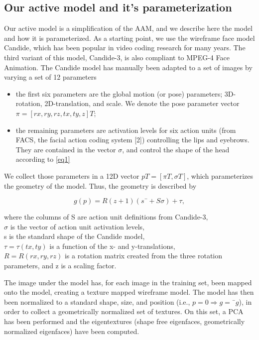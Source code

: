 \documentclass[12pt]{acmart}
\begin{document}
\begin{spacing}{2}   

\section{Our active model and it’s parameterization}
\label{sect:intro}  %
Our active model is a simplification of the AAM, and we describe here the model and how it is parameterized. As a starting point, we use the wireframe face model Candide, which has been popular in video coding research for many years. The third variant of this model, Candide-3, is also compliant to MPEG-4 Face Animation. The Candide model has manually been adapted to a set of images by varying a set of 12 parameters
\begin{itemize}
    \item the first six parameters are the global motion (or pose) parameters; 3D-rotation, 2D-translation, and scale. We denote the pose parameter vector $\pi = [rx ,ry ,rz ,tx ,ty ,z]T$;
    \item the remaining parameters are activation levels for six action units (from FACS, the facial action coding system [2]) controlling the lips and eyebrows. They are contained in the vector $\sigma$, and control the shape of the head according to \eqref{eq1}
\end{itemize}

We collect those parameters in a 12D vector $pT = [\pi T, \sigma T]$, which parameterizes the geometry of the model. Thus, the geometry is described by

\begin{equation}
    g(p)= R(z + 1)(s¯+ S\sigma)+ \tau,
    \label{eq1}
\end{equation}

where the columns of S are action unit definitions from Candide-3, \\
$\sigma$ is the vector of action unit activation levels, \\
s is the standard shape of the Candide model, \\
$\tau = \tau(tx,ty)$ is a function of the x- and y-translations, \\
$R = R(rx ,ry ,rz)$ is a rotation matrix created from the three rotation parameters, and z is a scaling factor.

The image under the model has, for each image in the training set, been mapped onto the model, creating a texture mapped wireframe model. The model has then been normalized to a standard shape, size, and position (i.e., $p = 0 \Rightarrow{} g = ¯g$), in order to collect a geometrically normalized set of textures. On this set, a PCA has been performed and the eigentextures (shape free eigenfaces, geometrically normalized eigenfaces) have been computed. 


\end{spacing}
\end{document}
